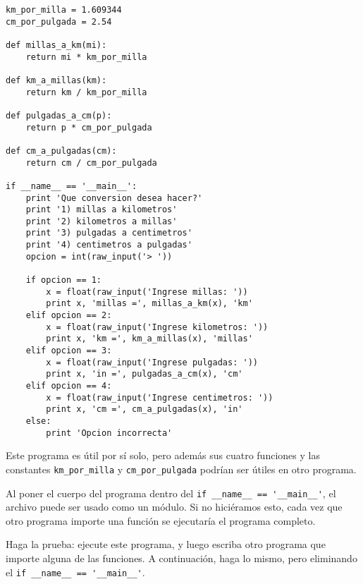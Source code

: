 \begin{lstlisting}
km_por_milla = 1.609344
cm_por_pulgada = 2.54

def millas_a_km(mi):
    return mi * km_por_milla

def km_a_millas(km):
    return km / km_por_milla

def pulgadas_a_cm(p):
    return p * cm_por_pulgada

def cm_a_pulgadas(cm):
    return cm / cm_por_pulgada

if __name__ == '__main__':
    print 'Que conversion desea hacer?'
    print '1) millas a kilometros'
    print '2) kilometros a millas'
    print '3) pulgadas a centimetros'
    print '4) centimetros a pulgadas'
    opcion = int(raw_input('> '))

    if opcion == 1:
        x = float(raw_input('Ingrese millas: '))
        print x, 'millas =', millas_a_km(x), 'km'
    elif opcion == 2:
        x = float(raw_input('Ingrese kilometros: '))
        print x, 'km =', km_a_millas(x), 'millas'
    elif opcion == 3:
        x = float(raw_input('Ingrese pulgadas: '))
        print x, 'in =', pulgadas_a_cm(x), 'cm'
    elif opcion == 4:
        x = float(raw_input('Ingrese centimetros: '))
        print x, 'cm =', cm_a_pulgadas(x), 'in'
    else:
        print 'Opcion incorrecta'
\end{lstlisting}

Este programa es útil por sí solo, pero además sus cuatro funciones y
las constantes \lstinline!km_por_milla! y \lstinline!cm_por_pulgada!
podrían ser útiles en otro programa.

Al poner el cuerpo del programa dentro del
\lstinline!if __name__ == '__main__'!, el archivo puede ser usado como
un módulo. Si no hiciéramos esto, cada vez que otro programa importe una
función se ejecutaría el programa completo.

Haga la prueba:
ejecute este programa, y luego escriba otro programa que importe alguna
de las funciones. A continuación, haga lo mismo, pero eliminando el
\lstinline!if __name__ == '__main__'!.
